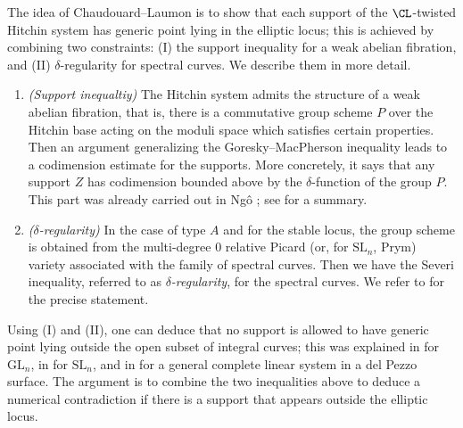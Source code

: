 The idea of Chaudouard--Laumon \cite{CL} is to show that each support of the $\CL$-twisted Hitchin system has generic point lying in the elliptic locus; this is achieved by combining two constraints: (I) the support inequality for a weak abelian fibration, and (II) $\delta$-regularity for spectral curves. We describe them in more detail.
\begin{enumerate}
    \item[(I)] \emph{(Support inequaltiy)} The Hitchin system admits the structure of a weak abelian fibration, that is, there is a commutative group scheme $P$ over the Hitchin base acting on the moduli space which satisfies certain properties. Then an argument generalizing the Goresky--MacPherson inequality leads to a codimension estimate for the supports. More concretely, it says that any support $Z$ has codimension bounded above by the $\delta$-function of the group $P$. This part was already carried out in Ng\^o \cite[Section 7]{Ngo}; see \cite[Section 1]{MS2} for a summary.
    \item[(II)] \emph{($\delta$-regularity)} In the case of type $A$ and for the stable locus, the group scheme is obtained from the multi-degree 0 relative Picard (or, for $\mathrm{SL}_n$, Prym) variety associated with the family of spectral curves. Then we have the Severi inequality, referred to as \emph{$\delta$-regularity}, for the spectral curves. We refer to \cite[Theorem 5.4.4]{dC_SL} for the precise statement.
\end{enumerate}

Using (I) and (II), one can deduce that no support is allowed to have generic point lying outside the open subset of integral curves; this was explained in \cite[Section 11]{CL} for $\mathrm{GL}_n$, in \cite[Section 6.2]{dC_SL} for $\mathrm{SL}_n$, and in \cite[Section 4.5]{MS2} for a general complete linear system in a del Pezzo surface. The argument is to combine the two inequalities above to deduce a numerical contradiction if there is a support that appears outside the elliptic locus.


